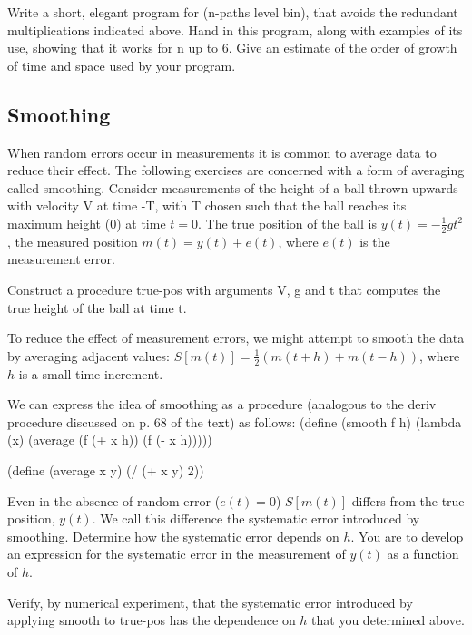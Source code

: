 
Write a short, elegant program for {\cf (n-paths level bin)},
that avoids the redundant multiplications indicated above.  Hand in
this program, along with examples of its use, 
showing that it works for n up to 6.  Give an estimate
of the order of growth of time and space used by your program.

\subsection{Smoothing}

When random errors occur in measurements it is common to average data to reduce
their effect.  The following exercises are concerned with a form of averaging
called smoothing.  Consider measurements of the height of a ball thrown upwards
with velocity V at time -T, with T chosen such that the ball reaches its
maximum height (0) at time $t=0$.  The true position of the ball is
$y(t)=-\frac{1}{2}gt^2$, the measured position $m(t)=y(t)+e(t)$, where $e(t)$
is the measurement error.


Construct a procedure {\cf true-pos} with arguments V, g and t that 
computes the true height of the ball at time t.

To reduce the effect of measurement errors, we might attempt to smooth the data
by averaging adjacent values: $S[m(t)] = \frac{1}{2}(m(t+h)+m(t-h))$, where $h$
is a small time increment.

We can express the idea of smoothing as a procedure (analogous to
the {\cf deriv} procedure discussed on p. 68 of the text) as follows:
\beginlisp
(define (smooth f h)
  (lambda (x)
    (average (f (+ x h))
	     (f (- x h)))))

(define (average x y)
  (/ (+ x y) 2))
\endlisp


Even in the absence of random error ($e(t)=0$) $S[m(t)]$ differs from the true
position, $y(t)$.  We call this difference the systematic error introduced by
smoothing.  Determine how the systematic error depends on $h$.  You are to
develop an expression for the systematic error in the measurement of $y(t)$ as
a function of $h$.


Verify, by numerical experiment, that the systematic error
introduced by applying {\cf smooth} to {\cf true-pos} has the 
dependence on $h$ that you determined above.

